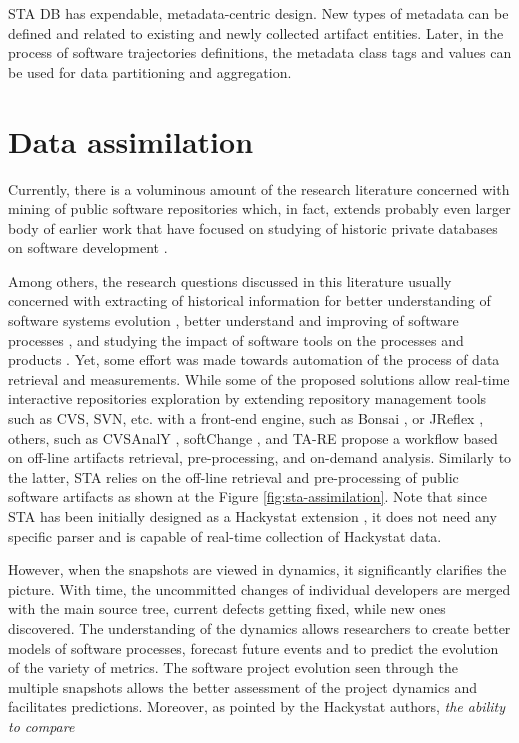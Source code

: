 STA DB has expendable, metadata-centric design. New types of metadata can be defined and related to existing and newly collected
artifact entities. Later, in the process of software trajectories definitions, the metadata class tags and values can be used 
for data partitioning and aggregation.

\section{Data assimilation}
Currently, there is a voluminous amount of the research literature concerned with mining of public software repositories 
\cite{citeulike:2710928} which, in fact, extends probably even larger body of earlier work that have focused on studying 
of historic private databases on software development \cite{citeulike:393158} \cite{citeulike:13125375} \cite{citeulike:13125481}.

Among others, the research questions discussed in this literature usually concerned with extracting of 
historical information for better understanding of software systems evolution \cite{citeulike:277045} \cite{citeulike:4000311}, 
better understand and improving of software processes \cite{citeulike:5803126}, 
and studying the impact of software tools on the processes and products \cite{citeulike:13125389}. 
Yet, some effort was made towards automation of the process of data retrieval and measurements. 
While some of the proposed solutions allow real-time interactive repositories exploration by extending 
repository management tools such as CVS, SVN, etc. with a front-end engine, such as Bonsai \cite{bonsai},
or JReflex \cite{citeulike:3017440}, others, such as CVSAnalY \cite{citeulike:6544724}, softChange \cite{citeulike:13125395},
and {TA}-{RE} \cite{citeulike:4000311} propose a workflow based on off-line artifacts retrieval, 
pre-processing, and on-demand analysis.
Similarly to the latter, STA relies on the off-line retrieval and pre-processing of public software artifacts as
shown at the Figure \ref{fig:sta-assimilation}. Note that since STA has been initially designed as a Hackystat 
extension \cite{csdl2-10-09}, it does not need any specific parser and is capable of real-time 
collection of Hackystat data.

However, when the snapshots are viewed in dynamics, it significantly clarifies the picture. 
With time, the uncommitted changes of individual developers are merged with the main source tree, 
current defects getting fixed, while new ones discovered. 
The understanding of the dynamics allows researchers to create better models of software processes, 
forecast future events and to predict the evolution of the variety of metrics.
The software project evolution seen through the multiple snapshots allows the better 
assessment of the project dynamics and facilitates predictions. Moreover, as pointed by the Hackystat authors, 
\cite{citeulike:557296} \textit{the ability to compare}

